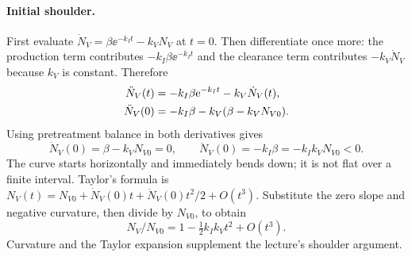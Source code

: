 \paragraph{Initial shoulder.}
First evaluate $\dot N_V=\beta\ee^{-k_It}-k_VN_V$ at $t=0$. Then differentiate once more: the production term contributes $-k_I\beta\ee^{-k_It}$ and the clearance term contributes $-k_V\dot N_V$ because $k_V$ is constant. Therefore
\begin{align}
\ddot N_V(t)&=-k_I\beta\mathrm{e}^{-k_It}-k_V\dot N_V(t),\notag\\
\ddot N_V(0)&=-k_I\beta-k_V(\beta-k_VN_{V0}).\label{eq:viral-curvature-derivation}
\end{align}
Using pretreatment balance in both derivatives gives
\begin{equation}\label{eq:initial-derivatives}
\dot N_V(0)=\beta-k_VN_{V0}=0,\qquad
\ddot N_V(0)=-k_I\beta=-k_Ik_VN_{V0}<0.
\end{equation}
The curve starts horizontally and immediately bends down; it is not flat over a finite interval. Taylor's formula is $N_V(t)=N_{V0}+\dot N_V(0)t+\ddot N_V(0)t^2/2+O(t^3)$. Substitute the zero slope and negative curvature, then divide by $N_{V0}$, to obtain
\begin{equation}\label{eq:early-time}
N_V/N_{V0}=1-\tfrac12k_Ik_Vt^2+O(t^3).
\end{equation}
Curvature and the Taylor expansion supplement the lecture's shoulder argument.

